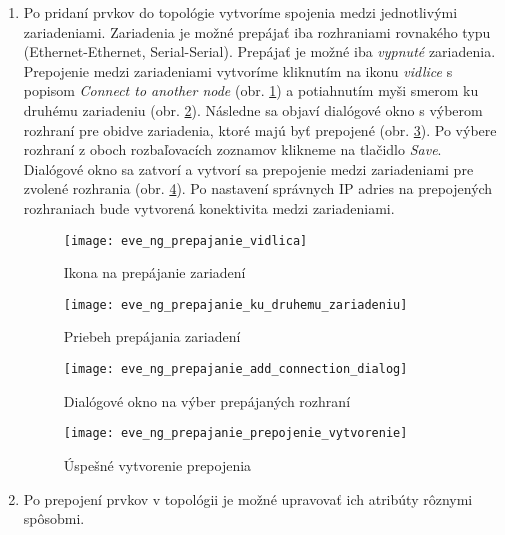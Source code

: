 \begin{enumerate}[noitemsep]
    \item Po pridaní prvkov do topológie vytvoríme spojenia medzi jednotlivými zariadeniami. Zariadenia je možné prepájať iba rozhraniami rovnakého typu (Ethernet-Ethernet, Serial-Serial). Prepájať je možné iba \emph{vypnuté} zariadenia. Prepojenie medzi zariadeniami vytvoríme kliknutím na ikonu \emph{vidlice} s popisom \emph{Connect to another node} (obr. \ref{obr:eve_ng_prepajanie_vidlica}) a potiahnutím myši smerom ku druhému zariadeniu (obr. \ref{obr:eve_ng_prepajanie_ku_druhemu_zariadeniu}). Následne sa objaví dialógové okno s výberom rozhraní pre obidve zariadenia, ktoré majú byť prepojené (obr. \ref{obr:eve_ng_prepajanie_add_connection_dialog}). Po výbere rozhraní z oboch rozbaľovacích zoznamov klikneme na tlačidlo \emph{Save}. Dialógové okno sa zatvorí a vytvorí sa prepojenie medzi zariadeniami pre zvolené rozhrania (obr. \ref{obr:eve_ng_prepajanie_prepojenie_vytvorenie}). Po nastavení správnych IP adries na prepojených rozhraniach bude vytvorená konektivita medzi zariadeniami.
    
    \begin{figure}
        \centering
        \texttt{[image: eve\_ng\_prepajanie\_vidlica]}
        \caption{Ikona na prepájanie zariadení}
        \label{obr:eve_ng_prepajanie_vidlica}
    \end{figure}
    
    \begin{figure}
        \centering
        \texttt{[image: eve\_ng\_prepajanie\_ku\_druhemu\_zariadeniu]}
        \caption{Priebeh prepájania zariadení}
        \label{obr:eve_ng_prepajanie_ku_druhemu_zariadeniu}
    \end{figure}
    
    \begin{figure}
        \centering
        \texttt{[image: eve\_ng\_prepajanie\_add\_connection\_dialog]}
        \caption{Dialógové okno na výber prepájaných rozhraní}
        \label{obr:eve_ng_prepajanie_add_connection_dialog}
    \end{figure}
    
    \begin{figure}
        \centering
        \texttt{[image: eve\_ng\_prepajanie\_prepojenie\_vytvorenie]}
        \caption{Úspešné vytvorenie prepojenia}
        \label{obr:eve_ng_prepajanie_prepojenie_vytvorenie}
    \end{figure}
    
    \item Po prepojení prvkov v topológii je možné upravovať ich atribúty rôznymi spôsobmi.
    

\end{enumerate}
